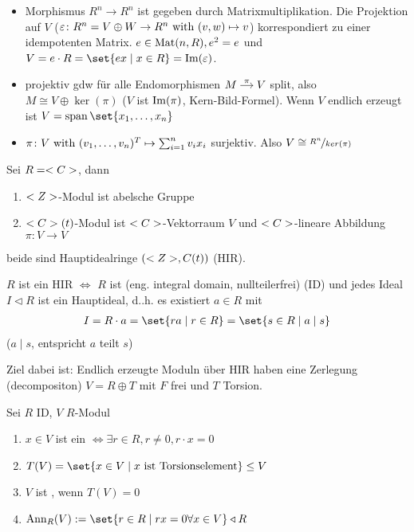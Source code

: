 \begin{erinnerung}
	\begin{itemize}
		\item Morphismus $R^n \to R^n$ ist gegeben durch Matrixmultiplikation. Die Projektion auf $V$ ($\varepsilon \colon R^n = V \oplus W \to R^n \text{ with } (v,w) \mapsto v$) korrespondiert zu einer idempotenten Matrix. $e \in \operatorname{Mat}(n,R), e^2 = e$ und $V = e\cdot R = \set{e x \mid x \in R} = \Image(\epsilon)$. 
		\item projektiv gdw für alle Endomorphismen $\begin{tikzcd}[cramped, sep=small]
		M \arrow[r, "\pi"] & V
		\end{tikzcd}$ split, also $M \cong V \oplus \ker(\pi)$ ($V$ ist $\operatorname{Im}(\pi)$, Kern-Bild-Formel). Wenn $V$ endlich erzeugt ist $V = \Span\set{x_1, \dots, x_n}$
		\item $\pi \colon V \text{ with } (v_1, \dots, v_n)^T \mapsto \sum_{i=1}^n v_i x_i$ surjektiv. Also $V \cong \lnkset{R^n}{ker(\pi)}$
	\end{itemize}
\end{erinnerung}
\begin{example}
	Sei $R = <C>$, dann
	\begin{enumerate}
		\item $<Z>$-Modul ist abelsche Gruppe
		\item $<C>(t)$-Modul ist $<C>$-Vektorraum $V$ und $<C>$-lineare Abbildung $\pi\colon V \to V$
	\end{enumerate}
	beide sind Hauptidealringe $(<Z>, C(t))$ (HIR).
\end{example}
\begin{definition}
	$R$ ist ein HIR $\Leftrightarrow$ $R$ ist  (eng. integral domain, nullteilerfrei) (ID) und jedes Ideal $I \lhd R$ ist ein Hauptideal, d..h. es existiert $a \in R$ mit
	\begin{align*}
		I = R \cdot a = \set{ra \mid r \in R} = \set{s \in R \mid a \mid s}
	\end{align*}
	($a \mid s$, entspricht $a$ teilt $s$)
\end{definition}
Ziel dabei ist: Endlich erzeugte Moduln über HIR haben eine Zerlegung (decompositon) $V = R \oplus T$ mit $F$ frei und $T$ Torsion.
\begin{definition}
	Sei $R$ ID, $V$ $R$-Modul
	\begin{enumerate}
		\item $x \in V$ ist ein  $\Leftrightarrow \exists r \in R, r \neq 0, r\cdot x = 0$
		\item $T(V) = \set{x \in V \mid x \text{ ist Torsionselement}} \le V$
		\item $V$ ist , wenn $T(V) = 0$
		\item {} $\Ann_R (V) := \set{r \in R \mid rx = 0 \forall x \in V} \lhd R$
	\end{enumerate}
\end{definition}
